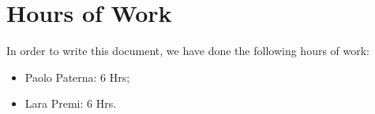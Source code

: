 \documentclass[12pt,a4paper]{article}
\begin{document}
	
	\tableofcontents
	\newpage
	
	
	
	
	\section{Hours of Work}
	In order to write this document, we have done the following hours of work:
	\begin{itemize}
	\item Paolo Paterna: 6 Hrs;
	\item Lara Premi: 6 Hrs.
	\end{itemize}
	\newpage
\end{document}
